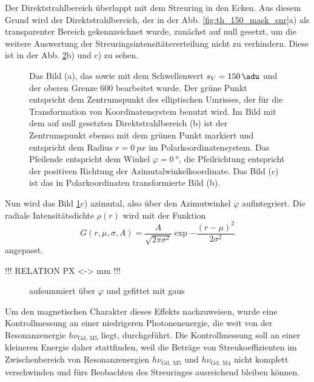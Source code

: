 \noindent
Der Direktstrahlbereich überlappt mit dem Streuring in den Ecken. Aus diesem Grund wird der Direktstrahlbereich, der in der Abb. \ref{fig:th_150_mask_snr}a) als transparenter Bereich gekennzeichnet wurde, zunächst auf null gesetzt, um die weitere Auswertung der Streuringsintensitätsverteilung nicht zu verhindern. Diese ist in der Abb. \ref{fig:radius_fit}b) und c) zu sehen.
\begin{figure}[H]
    \centering
    
    \caption{Das Bild (a), das sowie mit dem Schwellenwert $s_V = \SI{150}{\adu}$ und der oberen Grenze \SI{600}{\adu} bearbeitet wurde. Der grüne Punkt entspricht dem Zentrumspunkt des elliptischen Umrisses, der für die Transformation von Koordinatensystem benutzt wird. Im Bild mit dem auf null gesetzten Direktstrahlbereich (b) ist der Zentrumspunkt ebenso mit dem grünen Punkt markiert und entspricht dem Radius $r=\SI{0}{px}$ im Polarkoordinatensystem. Das Pfeilende entspricht dem Winkel $\varphi = \SI{0}{\degree}$, die Pfeilrichtung entspricht der positiven Richtung der Azimutalwinkelkoordinate. Das Bild (c) ist das in Polarkoordinaten transformierte Bild (b).}
    \label{fig:th-150-200-maske-radial-transform}
\end{figure}
\noindent
Nun wird das Bild \ref{fig:th-150-200-maske-radial-transform}c) azimutal, also über den Azimutwinkel $\varphi$ aufintegriert. Die radiale Intensitätsdichte $\rho(r)$ wird mit der Funktion 
\begin{equation}
    G(r, \mu, \sigma, A) = \frac{A}{\sqrt{2\pi \sigma^2}}\exp{-\frac{(r - \mu)^2}{2\sigma^2}}
\end{equation}
angepasst.

!!! RELATION PX <-> mm !!!

\begin{figure}[H]
    \centering
    
    \caption{aufsummiert über $\varphi$ und gefittet mit gaus  }
    \label{fig:radius_fit}
\end{figure}

\noindent
Um den magnetischen Charakter dieses Effekts nachzuweisen, wurde eine Kontrollmessung an einer niedrigeren Photonenenergie, die weit von der Resonanzenergie $h\nu_{\text{Gd, M5}}$ liegt, durchgeführt. Die Kontrollmessung soll an einer kleineren Energie daher stattfinden, weil die Beträge von Streukoeffizienten im Zwischenbereich von Resonanzenergien $h\nu_{\text{Gd, M5}}$ und $h\nu_{\text{Gd, M4}}$ nicht komplett verschwinden und fürs Beobachten des Streuringes ausreichend bleiben können.


